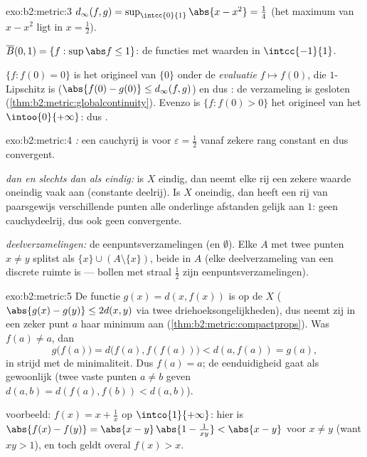 \begin{solution}{exo:b2:metric:3}
$d_\infty(f, g) = \sup_{\intcc{0}{1}} \abs{x - x^2} = \frac14$ (het
maximum van $x - x^2$ ligt in $x = \frac12$).

$\overline B(0, 1) = \{f : \sup\abs f \leq 1\}$: de 
functies met waarden in $\intcc{-1}{1}$.

$\{f : f(0) = 0\}$ is het origineel van $\{0\}$ onder de
\emph{evaluatie} $f \mapsto f(0)$, die $1$-Lipschitz is
($\abs{f(0) - g(0)} \leq d_\infty(f,g)$) en dus : de
verzameling is gesloten
(\cref{thm:b2:metric:globalcontinuity}). Evenzo is $\{f : f(0) >
0\}$ het origineel van het  $\intoo{0}{+\infty}$: dus .
\end{solution}

\begin{solution}{exo:b2:metric:4}
\emph{:} een cauchyrij is voor $\varepsilon = \frac12$
vanaf zekere rang constant en dus convergent.

\emph{ dan en slechts dan als eindig:} is $X$ eindig, dan
neemt elke rij een zekere waarde oneindig vaak aan (constante
deelrij). Is $X$ oneindig, dan heeft een rij van paarsgewijs
verschillende punten alle onderlinge afstanden gelijk aan $1$: geen
cauchydeelrij, dus ook geen convergente.

\emph{ deelverzamelingen:} de eenpuntsverzamelingen
(en $\emptyset$). Elke $A$ met twee punten $x \neq y$ splitst als
$\{x\} \cup (A \setminus\{x\})$, beide  in $A$ (elke
deelverzameling van een discrete ruimte is  --- bollen met
straal $\frac12$ zijn eenpuntsverzamelingen).
\end{solution}

\begin{solution}{exo:b2:metric:5}
De functie $g(x) = d(x, f(x))$ is  op de  $X$
($\abs{g(x) - g(y)} \leq 2d(x,y)$ via twee
driehoeksongelijkheden), dus neemt zij in een zeker punt $a$ haar
minimum aan (\cref{thm:b2:metric:compactprops}). Was $f(a) \neq a$,
dan
\[
g\bigl(f(a)\bigr) = d\bigl(f(a), f(f(a))\bigr) < d(a, f(a)) = g(a),
\]
in strijd met de minimaliteit. Dus $f(a) = a$; de eenduidigheid
gaat als gewoonlijk (twee vaste punten $a \neq b$ geven $d(a,b) =
d(f(a), f(b)) < d(a,b)$).

 voorbeeld: $f(x) = x + \frac1x$ op
$\intco{1}{+\infty}$: hier is $\abs{f(x) - f(y)} = \abs{x -
y}\,\abs{1 - \frac{1}{xy}} < \abs{x - y}$ voor $x \neq y$ (want $xy
> 1$), en toch geldt overal $f(x) > x$.
\end{solution}

